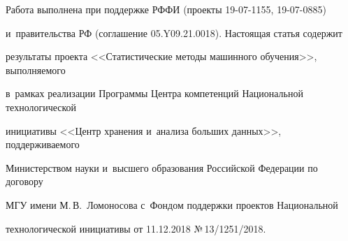 {\renewcommand{\thefootnote}{\fnsymbol{footnote}} \footnotetext[1]


{Работа выполнена при поддержке РФФИ (проекты 19-07-1155, 19-07-0885) 


и~правительства РФ (соглашение 05.Y09.21.0018). Настоящая статья содержит 


результаты проекта <<Статистические методы машинного обучения>>, выполняемого 


в~рамках реализации Программы Центра компетенций Национальной технологической 


инициативы <<Центр хранения и~анализа больших данных>>, поддерживаемого 


Министерством науки и~высшего образования Российской Федерации по договору 


МГУ имени М.\,В.~Ломоносова  с~Фондом поддержки проектов Национальной 


технологической инициативы от 11.12.2018 №\,13/1251/2018.}}








\renewcommand{\thefootnote}{\arabic{footnote}}


















